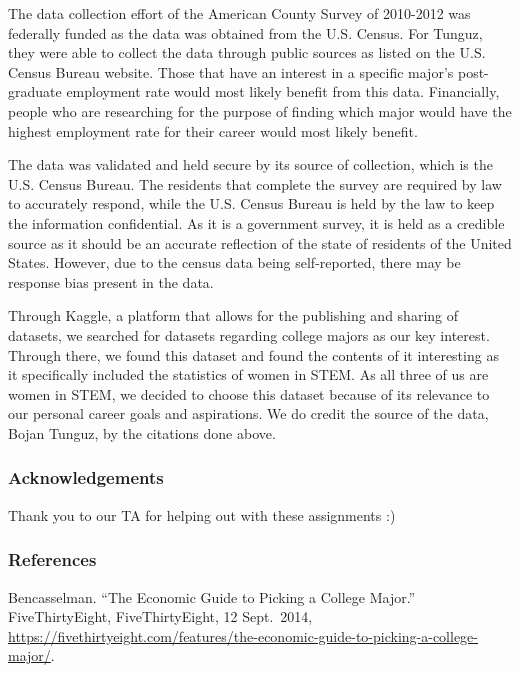 \documentclass[
]{article}
\begin{document}
The data collection effort of the American County Survey of 2010-2012
was federally funded as the data was obtained from the U.S. Census. For
Tunguz, they were able to collect the data through public sources as
listed on the U.S. Census Bureau website. Those that have an interest in
a specific major's post-graduate employment rate would most likely
benefit from this data. Financially, people who are researching for the
purpose of finding which major would have the highest employment rate
for their career would most likely benefit.

The data was validated and held secure by its source of collection,
which is the U.S. Census Bureau. The residents that complete the survey
are required by law to accurately respond, while the U.S. Census Bureau
is held by the law to keep the information confidential. As it is a
government survey, it is held as a credible source as it should be an
accurate reflection of the state of residents of the United States.
However, due to the census data being self-reported, there may be
response bias present in the data.

Through Kaggle, a platform that allows for the publishing and sharing of
datasets, we searched for datasets regarding college majors as our key
interest. Through there, we found this dataset and found the contents of
it interesting as it specifically included the statistics of women in
STEM. As all three of us are women in STEM, we decided to choose this
dataset because of its relevance to our personal career goals and
aspirations. We do credit the source of the data, Bojan Tunguz, by the
citations done above.

\hypertarget{acknowledgements}{%
\subsubsection{Acknowledgements}\label{acknowledgements}}

Thank you to our TA for helping out with these assignments :)

\hypertarget{references}{%
\subsubsection{References}\label{references}}

Bencasselman. ``The Economic Guide to Picking a College Major.''
FiveThirtyEight, FiveThirtyEight, 12 Sept.~2014,
\url{https://fivethirtyeight.com/features/the-economic-guide-to-picking-a-college-major/}.
\end{document}
